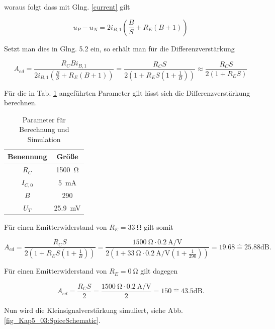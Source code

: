 woraus folgt dass mit Glng. \ref{current} gilt

\begin{equation}
    u_P - u_N = 2i_{B,1} \left( \frac{B}{S} + R_E(B+1) \right)
\end{equation}

Setzt man dies in Glng. 5.2 ein, so erhält man für die Differenzverstärkung

\begin{equation}
    A_{ed} = \frac{R_C B i_{B,1}}{2i_{B,1} \left( \frac{B}{S} + R_E(B+1) \right)} = \frac{R_C S}{2\left( 1 + R_E S(1+\frac{1}{B}) \right)} \approx \frac{R_C S}{2\left( 1 + R_E S \right)}
\end{equation}

Für die in Tab. \ref{tab_Kap5_01:Bauteilwerte} angeführten Parameter gilt lässt sich die Differenzverstärkung berechnen.

\begin{table}[H]
\centering
\begin{tabular}{|c|c|} \hline
Benennung & Größe \\ \hline
$R_C$ & \SI{1500}{\ohm} \\ \hline
$I_{C,0}$ & \SI{5}{\milli\ampere} \\ \hline
$B$ & 290 \\ \hline
$U_T$ & \SI{25,9}{\milli\volt} \\ \hline
\end{tabular}
\caption{Parameter für Berechnung und Simulation}
\label{tab_Kap5_01:Bauteilwerte} 
\end{table}

Für einen Emitterwiderstand von $R_E = \SI{33}{\ohm}$ gilt somit

\begin{equation}
    A_{ed} = \frac{R_C S}{2\left( 1 + R_E S(1+\frac{1}{B}) \right)} = \frac{\SI{1500}{\ohm}\cdot\SI{0,2}{\ampere\per\volt}}{2(1+\SI{33}{\ohm} \cdot \SI{0,2}{\ampere\per\volt} (1 + \frac{1}{290}) )} = 19.68 \hat{=} 25.88\text{dB} .
\end{equation}

Für einen Emitterwiderstand von $R_E = \SI{0}{\ohm}$ gilt dagegen

\begin{equation}
    A_{ed} = \frac{R_C S}{2} =  \frac{\SI{1500}{\ohm}\cdot\SI{0,2}{\ampere\per\volt}}{2} = 150 \hat{=} 43.5\text{dB} .
\end{equation}

Nun wird die Kleinsignalverstärkung simuliert, siehe Abb. \ref{fig_Kap5_03:SpiceSchematic}.

